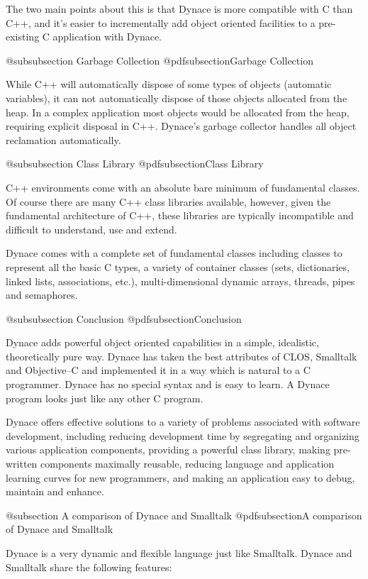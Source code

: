 The two main points about this is that Dynace is more compatible with
C than C++, and it's easier to incrementally add object oriented
facilities to a pre-existing C application with Dynace.


@subsubsection Garbage Collection
@pdfsubsection{Garbage Collection}

While C++ will automatically dispose of some types of objects (automatic
variables), it can not automatically dispose of those objects allocated
from the heap.  In a complex application most objects would be allocated
from the heap, requiring explicit disposal in C++.  Dynace's garbage collector
handles all object reclamation automatically.


@subsubsection Class Library
@pdfsubsection{Class Library}

C++ environments come with an absolute bare minimum of fundamental classes.
Of course there are many C++ class libraries available, however, given
the fundamental architecture of C++, these libraries are typically
incompatible and difficult to understand, use and extend.

Dynace comes with a complete set of fundamental classes including classes
to represent all the basic C types, a variety of container classes (sets,
dictionaries, linked lists, associations, etc.), multi-dimensional dynamic
arrays, threads, pipes and semaphores.


@subsubsection Conclusion
@pdfsubsection{Conclusion}


Dynace adds powerful object oriented capabilities in a simple,
idealistic, theoretically pure way.  Dynace has taken the best
attributes of CLOS, Smalltalk and Objective--C and implemented it in a
way which is natural to a C programmer.  Dynace has no special syntax
and is easy to learn.  A Dynace program looks just like any other C
program.

Dynace offers effective solutions to a variety of problems associated
with software development, including reducing development time by
segregating and organizing various application components, providing a
powerful class library, making pre-written components maximally
reusable, reducing language and application learning curves for new
programmers, and making an application easy to debug, maintain and
enhance.



@subsection A comparison of Dynace and Smalltalk
@pdfsubsection{A comparison of Dynace and Smalltalk}


Dynace is a very dynamic and flexible language just like
Smalltalk.  Dynace and Smalltalk share the following features:

